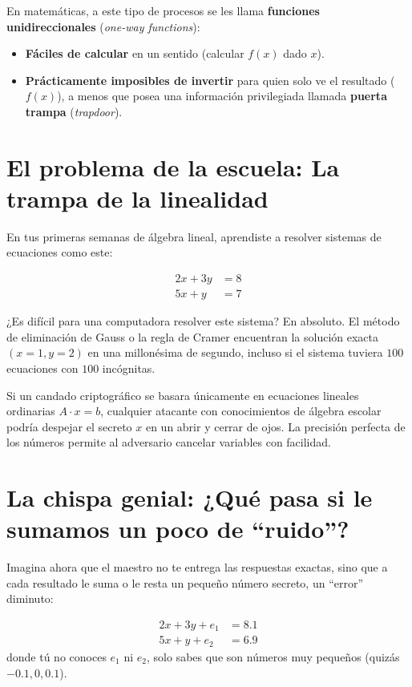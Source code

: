 En matemáticas, a este tipo de procesos se les llama \textbf{funciones unidireccionales} (\textit{one-way functions}):
\begin{itemize}
  \item \textbf{Fáciles de calcular} en un sentido (calcular $f(x)$ dado $x$).
  \item \textbf{Prácticamente imposibles de invertir} para quien solo ve el resultado ($f(x)$), a menos que posea una información privilegiada llamada \textbf{puerta trampa} (\textit{trapdoor}).
\end{itemize}

\section{El problema de la escuela: La trampa de la linealidad}

En tus primeras semanas de álgebra lineal, aprendiste a resolver sistemas de ecuaciones como este:

\begin{align*}
2x + 3y &= 8 \\
5x + y &= 7
\end{align*}

¿Es difícil para una computadora resolver este sistema? En absoluto. El método de eliminación de Gauss o la regla de Cramer encuentran la solución exacta $(x=1, y=2)$ en una millonésima de segundo, incluso si el sistema tuviera $100$ ecuaciones con $100$ incógnitas.

\begin{ojo}
Si un candado criptográfico se basara únicamente en ecuaciones lineales ordinarias $A \cdot x = b$, cualquier atacante con conocimientos de álgebra escolar podría despejar el secreto $x$ en un abrir y cerrar de ojos. La precisión perfecta de los números permite al adversario cancelar variables con facilidad.
\end{ojo}

\section{La chispa genial: ¿Qué pasa si le sumamos un poco de ``ruido''?}

Imagina ahora que el maestro no te entrega las respuestas exactas, sino que a cada resultado le suma o le resta un pequeño número secreto, un ``error'' diminuto:

\begin{align*}
2x + 3y + e_1 &= 8.1 \\
5x + y + e_2 &= 6.9
\end{align*}
donde tú no conoces $e_1$ ni $e_2$, solo sabes que son números muy pequeños (quizás $-0.1, 0, 0.1$).

